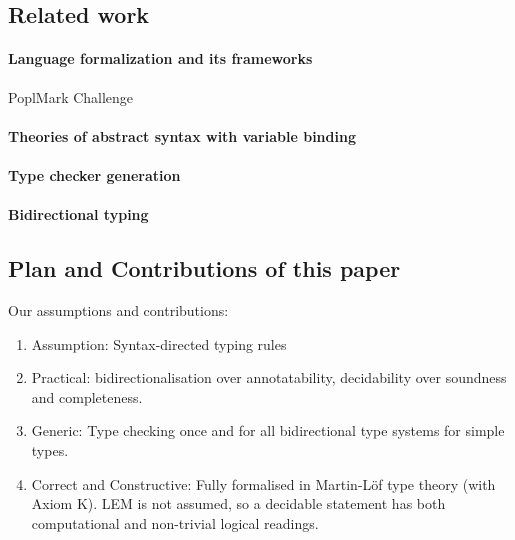 \subsection{Related work}

\citep{Xie2018}
\paragraph{Language formalization and its frameworks}
\cite{Wadler2022}
PoplMark Challenge~\citep{Aydemir2005}

\cite{Cimini2020,Cimini2022}

\citep{Ahrens2018,Fiore2022,Gheri2020,Ahrens2022}
\cite{Allais2021}

\paragraph{Theories of abstract syntax with variable binding}
\cite{Fiore1999,Hirschowitz2010,Ahrens2018,Fiore2022,Ahrens2021,Arkor2020,Hirschowitz2022}
\cite{Fiore2013,Hamana2011,Hamana2022}


\paragraph{Type checker generation}
\cite{Gast2004,Grewe2015,Pacak2020,Cimini2020}

\paragraph{Bidirectional typing}

\cite{Pierce2000}
\cite{Peyton-Jones2007}
\cite{Dunfield2021}


\subsection{Plan and Contributions of this paper}

Our assumptions and contributions:
\begin{enumerate}
  \item Assumption: Syntax-directed typing rules
  \item Practical: bidirectionalisation over annotatability, decidability over soundness and completeness.
  \item Generic: Type checking once and for all bidirectional type systems for simple types.
  \item Correct and Constructive: Fully formalised in Martin-Löf type theory (with Axiom K).
    LEM is not assumed, so a decidable statement has both computational and non-trivial logical readings.
\end{enumerate}

